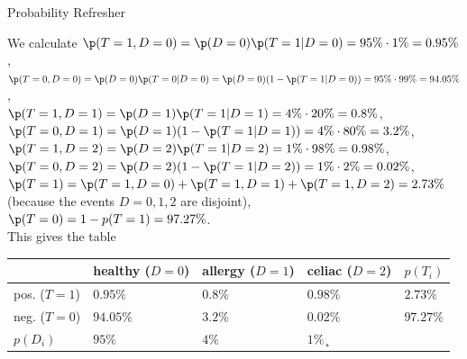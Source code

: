 \documentclass[english]{exercisesheet}
\author{Daniel Strenger, Lorenzo Minneci}
\begin{document}
 \makedocumentheader
 \begin{nexercise}{Probability Refresher}
 \end{nexercise}
 \begin{solution}
 We calculate $\p(T=1,D=0)=\p(D=0)\p(T=1|D=0)=95\%\cdot1\%=0.95\%$,\\
 $\p(T=0,D=0)=\p(D=0)\p(T=0|D=0)=\p(D=0)(1-\p(T=1|D=0))=95\%\cdot99\%=94.05\%$,\\
 $\p(T=1,D=1)=\p(D=1)\p(T=1|D=1)=4\%\cdot20\%=0.8\%$,
\\
$\p(T=0,D=1)=\p(D=1)(1-\p(T=1|D=1))=4\%\cdot80\%=3.2\%$,\\
$\p(T=1,D=2)=\p(D=2)\p(T=1|D=2)=1\%\cdot98\%=0.98\%$,\\
$\p(T=0,D=2)=\p(D=2)(1-\p(T=1|D=2))=1\%\cdot2\%=0.02\%$,\\
$\p(T=1)=\p(T=1,D=0)+\p(T=1,D=1)+\p(T=1,D=2)=2.73\%$ (because the events $D=0,1,2$ are disjoint),\\
$\p(T=0)=1-p(T=1)=97.27\%$.\\
This gives the table
  \begin{center}
\begin{tabular}{|l|l|l|l|l|}
\hline
 & healthy ($D=0$) &allergy ($D=1$)  &celiac ($D=2$)  &$p(T_i)$  \\ \hline
pos. ($T=1$)&$0.95\%$  & $0.8\%$ & $0.98\%$ & $2.73\%$ \\ \hline
 neg. ($T=0$)& $94.05\%$ &$3.2\%$  & $0.02\%$ & $97.27\%$ \\ \hline
 $p(D_i)$& $95\%$ & $4\%$ & $1\%$¸ &  \\ \hline
\end{tabular}
\end{center}
 \end{solution}
 
\end{document}
